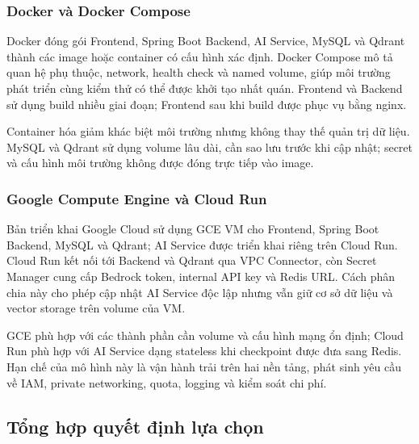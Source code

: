 \subsubsection{Docker và Docker Compose}

Docker đóng gói Frontend, Spring Boot Backend, AI Service, MySQL và Qdrant thành các image hoặc container có cấu hình xác định. Docker Compose mô tả quan hệ phụ thuộc, network, health check và named volume, giúp môi trường phát triển cùng kiểm thử có thể được khởi tạo nhất quán. Frontend và Backend sử dụng build nhiều giai đoạn; Frontend sau khi build được phục vụ bằng nginx.

Container hóa giảm khác biệt môi trường nhưng không thay thế quản trị dữ liệu. MySQL và Qdrant sử dụng volume lâu dài, cần sao lưu trước khi cập nhật; secret và cấu hình môi trường không được đóng trực tiếp vào image.

\subsubsection{Google Compute Engine và Cloud Run}

Bản triển khai Google Cloud sử dụng GCE VM cho Frontend, Spring Boot Backend, MySQL và Qdrant; AI Service được triển khai riêng trên Cloud Run. Cloud Run kết nối tới Backend và Qdrant qua VPC Connector, còn Secret Manager cung cấp Bedrock token, internal API key và Redis URL. Cách phân chia này cho phép cập nhật AI Service độc lập nhưng vẫn giữ cơ sở dữ liệu và vector storage trên volume của VM.

GCE phù hợp với các thành phần cần volume và cấu hình mạng ổn định; Cloud Run phù hợp với AI Service dạng stateless khi checkpoint được đưa sang Redis. Hạn chế của mô hình này là vận hành trải trên hai nền tảng, phát sinh yêu cầu về IAM, private networking, quota, logging và kiểm soát chi phí.

\subsection{Tổng hợp quyết định lựa chọn}

